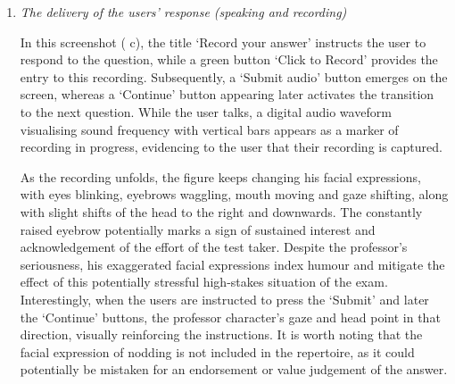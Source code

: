 \documentclass[english]{textolivre}
\begin{document}
\begin{enumerate}[label=\alph*.]
The effect of the imperative in the instruction featuring at the top of the screen – evocative of the authority of a classroom or exam setting – is mitigated by linguistic features in speech, such as the conditional “I would like…”. The interpersonal relationship is maintained through the ancillary role of the directionality of gaze and the facial expression with eyebrows moving.

The synergy of multimodal resources, including the tone of the voice, encourages the users while signposting the sequence and structure of the conversation: “\textit{I would like to ask you a few questions about…}”. In subsequent iterations of this interface, we see utterances such as: “\textit{I see, I have another question…}”, “\textit{Interesting…}” and “\textit{Thanks, let me ask you another question…}”.

The signposting offered by the character as simulated backchannelling forms a cohesive device and thus supports the enactment of a conversation with turn-taking. However, as there is no uptake by the character of any content that the user provides, there is only simulated coherence, as expected from a high-stakes test. The signposting is a marker of the restricted devolved agency of the AI, which chooses from a limited repertoire of responses. The design affords the user only a little time to think about their response, given that the transition to the next screen happens automatically.    

\item \textit{The delivery of the users’ response (speaking and recording)}

In this screenshot ( c), the title ‘Record your answer’ instructs the user to respond to the question, while a green button ‘Click to Record’ provides the entry to this recording. Subsequently, a ‘Submit audio’ button emerges on the screen, whereas a ‘Continue’ button appearing later activates the transition to the next question. While the user talks, a digital audio waveform visualising sound frequency with vertical bars appears as a marker of recording in progress, evidencing to the user that their recording is captured.

As the recording unfolds, the figure keeps changing his facial expressions, with eyes blinking, eyebrows waggling, mouth moving and gaze shifting, along with slight shifts of the head to the right and downwards. The constantly raised eyebrow potentially marks a sign of sustained interest and acknowledgement of the effort of the test taker. Despite the professor’s seriousness, his exaggerated facial expressions index humour and mitigate the effect of this potentially stressful high-stakes situation of the exam. Interestingly, when the users are instructed to press the ‘Submit’ and later the ‘Continue’ buttons, the professor character’s gaze and head point in that direction, visually reinforcing the instructions. It is worth noting that the facial expression of nodding is not included in the repertoire, as it could potentially be mistaken for an endorsement or value judgement of the answer.


\end{enumerate}
\end{document}
